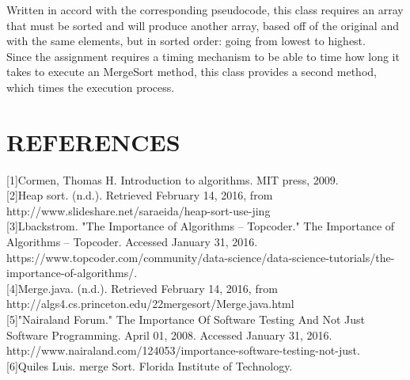 \documentclass[12pt]{article}
\begin{document}
Written in accord with the corresponding pseudocode, this class requires an array that must be sorted and will produce another array, based off of the original and with the same elements, but in sorted order: going from lowest to highest. \\

Since the assignment requires a timing mechanism to be able to time how long it takes to execute an MergeSort method, this class provides a second method, which times the execution process. 

\hrulefill 

\pagebreak
\section*{REFERENCES}



[1]Cormen, Thomas H. Introduction to algorithms. MIT press, 2009.\\


[2]Heap sort. (n.d.). Retrieved February 14, 2016, from http://www.slideshare.net/saraeida/heap-sort-use-jing\\

[3]Lbackstrom. "The Importance of Algorithms – Topcoder." The Importance of Algorithms – Topcoder. Accessed January 31, 2016. https://www.topcoder.com/community/data-science/data-science-tutorials/the-importance-of-algorithms/.\\


[4]Merge.java. (n.d.). Retrieved February 14, 2016, from http://algs4.cs.princeton.edu/22mergesort/Merge.java.html\\

[5]"Nairaland Forum." The Importance Of Software Testing And Not Just Software Programming. April 01, 2008. Accessed January 31, 2016. http://www.nairaland.com/124053/importance-software-testing-not-just.\\

[6]Quiles Luis. merge Sort. Florida Institute of Technology. 
\end{document}
